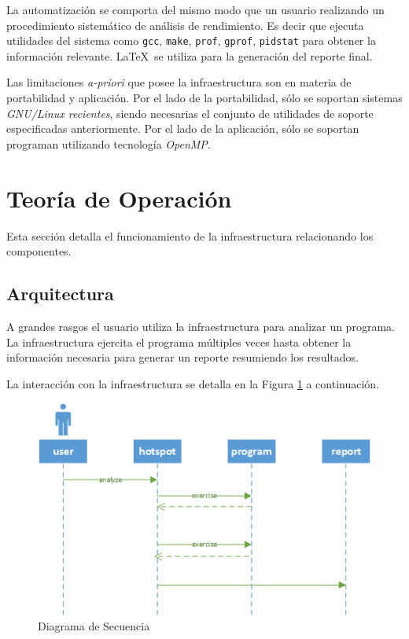 \documentclass[a4paper]{report}
\begin{document}
\bigskip

La automatización se comporta del mismo modo que un usuario realizando un procedimiento sistemático de análisis de rendimiento.
Es decir que ejecuta utilidades del sistema como {\tt gcc}, {\tt make}, {\tt prof}, {\tt gprof}, {\tt pidstat} para obtener la información relevante.
\LaTeX \, se utiliza para la generación del reporte final.

\bigskip

Las limitaciones {\it a-priori} que posee la infraestructura son en materia de portabilidad y aplicación. Por el lado de la portabilidad, sólo se soportan sistemas {\it GNU/Linux recientes}, siendo necesarias el conjunto de utilidades de soporte especificadas anteriormente. Por el lado de la aplicación, sólo se soportan programan utilizando tecnología {\it OpenMP}.

\section{Teoría de Operación}

Esta sección detalla el funcionamiento de la infraestructura relacionando los componentes.

\subsection{Arquitectura}

A grandes rasgos el usuario utiliza la infraestructura para analizar un programa.
La infraestructura ejercita el programa múltiples veces hasta obtener la información necesaria para generar un reporte resumiendo los resultados.

\bigskip

La interacción con la infraestructura se detalla en la Figura \ref{fig:hotspot-seq} a continuación.

\begin{figure}[H]
\begin{center}
\includegraphics[width=\textwidth]{hotspot-seq.png}
\caption{Diagrama de Secuencia}
\label{fig:hotspot-seq}
\end{center}
\end{figure}
\end{document}
